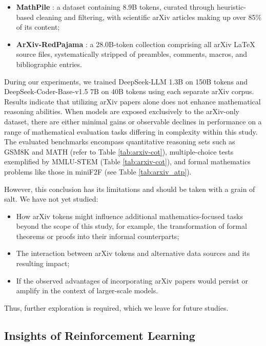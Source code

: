 \begin{itemize}[topsep=0pt]
\begin{itemize}[topsep=0pt]
\begin{itemize}[topsep=0pt]
    \item \textbf{MathPile} \citep{mathpile}: a dataset containing 8.9B tokens, curated through heuristic-based cleaning and filtering, with scientific arXiv articles making up over 85\% of its content;
    \item \textbf{ArXiv-RedPajama} \citep{redpajama}: a 28.0B-token collection comprising all arXiv LaTeX source files, systematically stripped of preambles, comments, macros, and bibliographic entries.
\end{itemize}

During our experiments, we trained DeepSeek-LLM 1.3B on 150B tokens and DeepSeek-Coder-Base-v1.5 7B on 40B tokens using each separate arXiv corpus. Results indicate that utilizing arXiv papers alone does not enhance mathematical reasoning abilities. When models are exposed exclusively to the arXiv-only dataset, there are either minimal gains or observable declines in performance on a range of mathematical evaluation tasks differing in complexity within this study. The evaluated benchmarks encompass quantitative reasoning sets such as GSM8K and MATH (refer to Table \ref{tab:arxiv-cot}), multiple-choice tests exemplified by MMLU-STEM (Table \ref{tab:arxiv-cot}), and formal mathematics problems like those in miniF2F (see Table \ref{tab:arxiv_atp}).

However, this conclusion has its limitations and should be taken with a grain of salt. We have not yet studied:

\begin{itemize}[topsep=0pt]
    \item How arXiv tokens might influence additional mathematics-focused tasks beyond the scope of this study, for example, the transformation of formal theorems or proofs into their informal counterparts;
    \item The interaction between arXiv tokens and alternative data sources and its resulting impact;
    \item If the observed advantages of incorporating arXiv papers would persist or amplify in the context of larger-scale models.
\end{itemize}

Thus, further exploration is required, which we leave for future studies.

\subsection{Insights of Reinforcement Learning}

\end{itemize}
\end{itemize}
